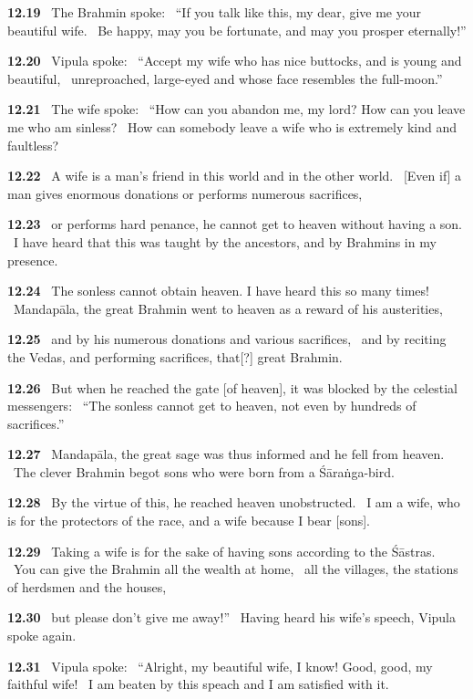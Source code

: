 \documentclass{article}
\begin{document}
\textbf{12.19}%
\ The Brahmin spoke:%
\ ``If you talk like this, my dear, give me your beautiful wife.%
\ Be happy, may you be fortunate, and may you prosper eternally!''%


\textbf{12.20}%
\ Vipula spoke:%
\ ``Accept my wife who has nice buttocks, and is young and beautiful,%
\ unreproached, large-eyed and whose face resembles the full-moon.''%


\textbf{12.21}%
\ The wife spoke:%
\ ``How can you abandon me, my lord? How can you leave me who am sinless?%
\ How can somebody leave a wife who is extremely kind and faultless?%


\textbf{12.22}%
\ A wife is a man's friend in this world and in the other world.%
\ [Even if] a man gives enormous donations or performs numerous sacrifices,%


\textbf{12.23}%
\ or performs hard penance, he cannot get to heaven without having a son.%
\ I have heard that this was taught by the ancestors, and by Brahmins in my presence.%


\textbf{12.24}%
\ The sonless cannot obtain heaven. I have heard this so many times!%
\ Mandapāla, the great Brahmin went to heaven as a reward of his austerities,%


\textbf{12.25}%
\ and by his numerous donations and various sacrifices,%
\ and by reciting the Vedas, and performing sacrifices, that[?] great Brahmin.%


\textbf{12.26}%
\ But when he reached the gate [of heaven], it was blocked by the celestial messengers:%
\ ``The sonless cannot get to heaven, not even by hundreds of sacrifices.''%


\textbf{12.27}%
\ Mandapāla, the great sage was thus informed and he fell from heaven.%
\ The clever Brahmin begot sons who were born from a Śāraṅga-bird.%


\textbf{12.28}%
\ By the virtue of this, he reached heaven unobstructed.%
\ I am a wife, who is for the protectors of the race, and a wife because I bear [sons].%


\textbf{12.29}%
\ Taking a wife is for the sake of having sons according to the Śāstras.%
\ You can give the Brahmin all the wealth at home,%
\      all the villages, the stations of herdsmen and the houses,%


\textbf{12.30}%
\ but please don't give me away!''%
\ Having heard his wife's speech, Vipula spoke again.%


\textbf{12.31}%
\ Vipula spoke:%
\ ``Alright, my beautiful wife, I know! Good, good, my faithful wife!%
\ I am beaten by this speach and I am satisfied with it.%
\end{document}
